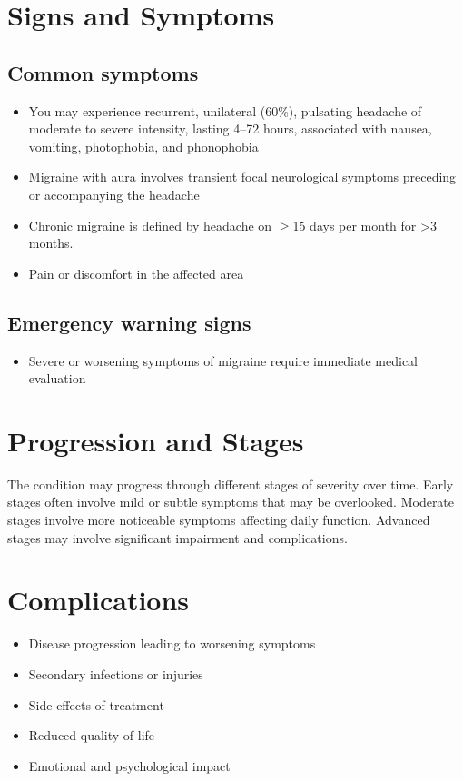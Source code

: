 \section{Signs and Symptoms}

\subsection{Common symptoms}
\begin{itemize}[noitemsep]
  \item You may experience recurrent, unilateral (60\%), pulsating headache of moderate to severe intensity, lasting 4--72 hours, associated with nausea, vomiting, photophobia, and phonophobia
  \item Migraine with aura involves transient focal neurological symptoms preceding or accompanying the headache
  \item Chronic migraine is defined by headache on $\ge$15 days per month for >3 months.
  \item Pain or discomfort in the affected area
  \end{itemize}

\subsection{Emergency warning signs}
\begin{itemize}[noitemsep]
  \item Severe or worsening symptoms of migraine require immediate medical evaluation
\end{itemize}
\section{Progression and Stages}
The condition may progress through different stages of severity over time. Early stages often involve mild or subtle symptoms that may be overlooked. Moderate stages involve more noticeable symptoms affecting daily function. Advanced stages may involve significant impairment and complications.
\section{Complications}
\begin{itemize}[noitemsep]
  \item Disease progression leading to worsening symptoms
  \item Secondary infections or injuries
  \item Side effects of treatment
  \item Reduced quality of life
  \item Emotional and psychological impact
\end{itemize}
